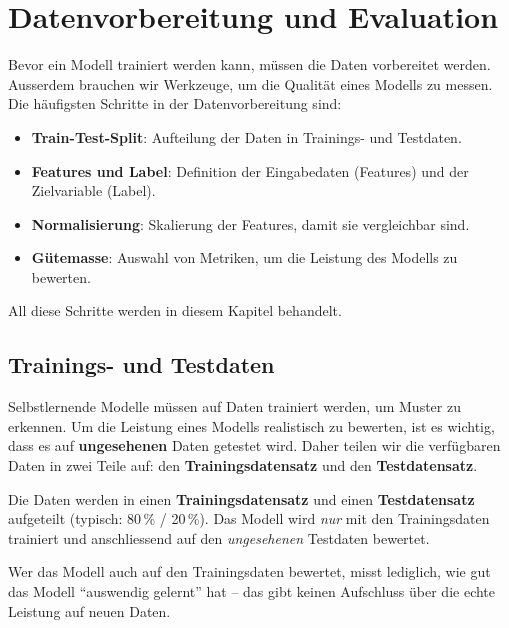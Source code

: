 \chapter{Datenvorbereitung und Evaluation}
\label{chap:datenvorbereitung}

Bevor ein Modell trainiert werden kann, müssen die Daten vorbereitet werden. Ausserdem brauchen wir Werkzeuge, um die Qualität eines Modells zu messen. Die häufigsten Schritte in der Datenvorbereitung sind:

\begin{itemize}
    \item \textbf{Train-Test-Split}: Aufteilung der Daten in Trainings- und Testdaten.
    \item \textbf{Features und Label}: Definition der Eingabedaten (Features) und der Zielvariable (Label).
    \item \textbf{Normalisierung}: Skalierung der Features, damit sie vergleichbar sind.
    \item \textbf{Gütemasse}: Auswahl von Metriken, um die Leistung des Modells zu bewerten.
\end{itemize}

All diese Schritte werden in diesem Kapitel behandelt.

\section{Trainings- und Testdaten}

Selbstlernende Modelle müssen auf Daten trainiert werden, um Muster zu erkennen. Um die Leistung eines Modells realistisch zu bewerten, ist es wichtig, dass es auf \textbf{ungesehenen} Daten getestet wird. Daher teilen wir die verfügbaren Daten in zwei Teile auf: den \textbf{Trainingsdatensatz} und den \textbf{Testdatensatz}.

\begin{mydefinition}
    Die Daten werden in einen \textbf{Trainings\-datensatz} und einen
    \textbf{Testdatensatz} aufgeteilt (typisch: 80\,\% / 20\,\%).
    Das Modell wird \emph{nur} mit den Trainingsdaten trainiert und
    anschliessend auf den \emph{ungesehenen} Testdaten bewertet.
\end{mydefinition}

\begin{mycaution}
    Wer das Modell auch auf den Trainingsdaten bewertet, misst lediglich, wie gut das Modell \enquote{auswendig gelernt} hat -- das gibt keinen Aufschluss über die echte Leistung auf neuen Daten.
\end{mycaution}

